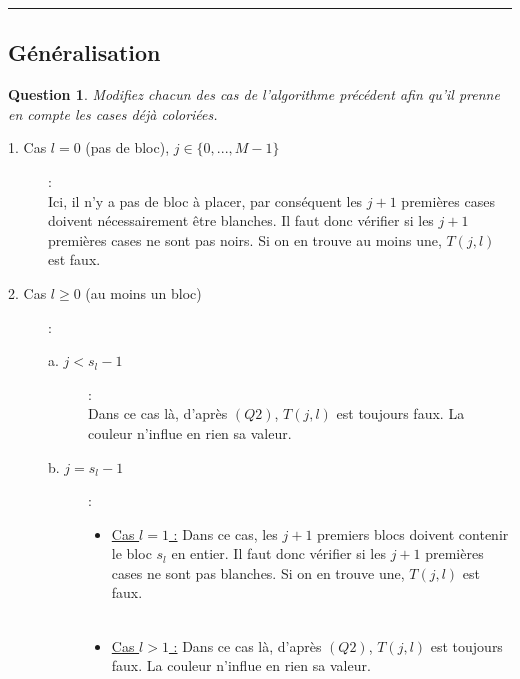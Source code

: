 \documentclass[a4paper,12pt]{article}
\newtheorem{exo}{Question}
\begin{document}
\noindent\rule{\textwidth}{1pt}
\newpage


\subsection{Généralisation}


\begin{exo}
	Modifiez chacun des cas de l'algorithme précédent afin qu'il prenne en compte les cases déjà coloriées.
\end{exo}

\begin{description}
	\item[1. Cas $l=0$ (pas de bloc), $j \in \{0,...,M-1\}$] :\\ 
	Ici, il n'y a pas de bloc à placer, par conséquent les $j + 1$ premières cases doivent nécessairement être blanches. Il faut donc vérifier si les $j + 1$ premières cases ne sont pas noirs. Si on en trouve au moins une, $T(j, l)$ est faux.\\

	\item[2. Cas $l \geq 0$ (au moins un bloc)] :
	\begin{description}
		\item[a. $j < s_l -1$] :\\
		Dans ce cas là, d'après $(Q2)$, $T(j, l)$ est toujours faux. La couleur n'influe en rien sa valeur.

		\item[b. $j = s_l -1$] :
		\begin{itemize}
			\item \underline{Cas $l = 1$ :} Dans ce cas, les $j + 1$ premiers blocs doivent contenir le bloc $s_l$ en entier. Il faut donc vérifier si les $j + 1$ premières cases ne sont pas blanches. Si on en trouve une, $T(j, l)$ est faux.\\
			\\

			\item \underline{Cas $l > 1$ :} Dans ce cas là, d'après $(Q2)$, $T(j, l)$ est toujours faux. La couleur n'influe en rien sa valeur.\\
		\end{itemize}


\end{description}
\end{description}
\end{document}
